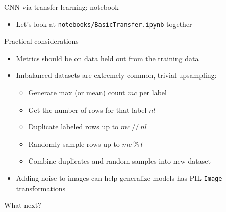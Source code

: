 \documentclass[hyperref={pdfpagelabels=false},12pt]{beamer}
\newcommand{\code}[2]{\texttt{#2}}
\newcommand{\python}[1]{\code{python}{#1}}
\newcommand{\unnamedUrl}[1]{\href{#1}{\color{blue}{#1}}}
\newcommand{\namedUrl}[2]{\href{#1}{\color{blue}{#2}}}
\begin{document}
\begin{frame}{CNN via transfer learning: notebook}
  \begin{itemize}
    \item Let's look at \texttt{notebooks/BasicTransfer.ipynb} together
  \end{itemize}
\end{frame}

\begin{frame}{Practical considerations}
  \begin{itemize}
    \item Metrics should be on data held out from the training data
    \item Imbalanced datasets are extremely common, trivial upsampling:
    \begin{itemize}
      \item Generate max (or mean) count $mc$ per label
      \item Get the number of rows for that label $nl$
      \item Duplicate labeled rows up to $mc\ //\ nl$
      \item Randomly sample rows up to $mc\ \%\ l$
      \item Combine duplicates and random samples into new dataset
    \end{itemize}
    \item Adding noise to images can help generalize models
      \namedUrl{https://pytorch.org/docs/stable/torchvision/transforms.html}{Torchvision
      transforms} has PIL \python{Image} transformations
  \end{itemize}
\end{frame}

\begin{frame}{What next?}
  \unnamedUrl{https://forms.gle/YWN8uXhiZLkbvXBM6}
\end{frame}
\end{document}

